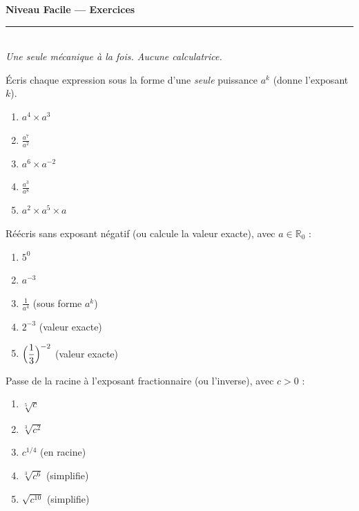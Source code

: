 \documentclass[11pt,a4paper]{article}
\newcommand{\R}{\mathbb{R}}
\newcommand{\ds}{\displaystyle}
\begin{document}
\begin{center}
{\LARGE\bfseries\color{primarydark} Niveau Facile — Exercices}\\[2pt]
{\color{primary}\rule{0.45\textwidth}{1.2pt}}\\[3pt]
{\small\itshape Une seule mécanique à la fois. Aucune calculatrice.}
\end{center}
\vspace{1mm}

\begin{exo}
Écris chaque expression sous la forme d'une \emph{seule} puissance $a^{k}$ (donne l'exposant $k$).
\begin{enumerate}[label=\alph*),leftmargin=2em,topsep=1pt,itemsep=1pt]
  \item $a^{4}\times a^{3}$ \qquad
  \item $\ds\frac{a^{7}}{a^{2}}$ \qquad
  \item $a^{6}\times a^{-2}$ \qquad
  \item $\ds\frac{a^{3}}{a^{8}}$ \qquad
  \item $a^{2}\times a^{5}\times a$
\end{enumerate}
\end{exo}

\begin{exo}
Réécris sans exposant négatif (ou calcule la valeur exacte), avec $a\in\R_0$ :
\begin{enumerate}[label=\alph*),leftmargin=2em,topsep=1pt,itemsep=1pt]
  \item $5^{0}$ \qquad
  \item $a^{-3}$ \qquad
  \item $\ds\frac{1}{a^{4}}$ (sous forme $a^{k}$) \qquad
  \item $2^{-3}$ (valeur exacte) \qquad
  \item $\ds\Bigl(\frac{1}{3}\Bigr)^{-2}$ (valeur exacte)
\end{enumerate}
\end{exo}

\begin{exo}
Passe de la racine à l'exposant fractionnaire (ou l'inverse), avec $c>0$ :
\begin{enumerate}[label=\alph*),leftmargin=2em,topsep=1pt,itemsep=1pt]
  \item $\sqrt[5]{c}$ \qquad
  \item $\sqrt[3]{c^{2}}$ \qquad
  \item $c^{1/4}$ (en racine) \qquad
  \item $\sqrt[3]{c^{6}}$ (simplifie) \qquad
  \item $\sqrt{c^{10}}$ (simplifie)
\end{enumerate}
\end{exo}
\end{document}
